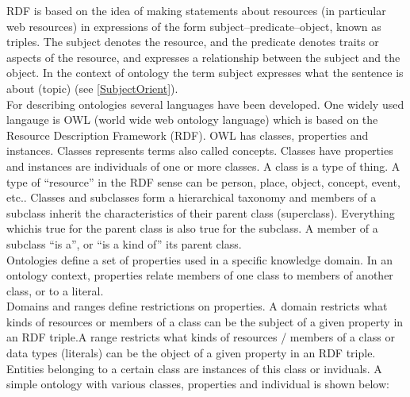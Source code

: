 RDF is based on the idea of making statements about resources (in particular web resources) in expressions of the form subject–predicate–object, known as triples. The subject denotes the resource, and the predicate denotes traits or aspects of the resource, and expresses a relationship between the subject and the object. In the context of ontology the term subject expresses what the sentence is about (topic) (see \ref{SubjectOrient}).\\
For describing ontologies several languages have been developed. One widely used langauge is OWL (world wide web ontology language) which is based on the Resource Description Framework (RDF).
OWL has classes, properties and instances. Classes represents terms also called concepts. Classes have properties and instances are individuals of one or more classes.
A class is a type of thing. A type of “resource” in the RDF sense can be
person, place, object, concept, event, etc.. Classes and subclasses form a hierarchical
taxonomy and members of a subclass inherit the characteristics of their parent class
(superclass). Everything whichis true for the parent class is also true for the subclass.
A member of a subclass “is a”, or “is a kind of” its parent class.\\
Ontologies define a set of properties used in a specific knowledge domain. In an ontology context, properties relate members of one class to members of another class, or to a literal.\\
Domains and ranges define restrictions on properties. A domain restricts what kinds of resources or members of a class can be the subject of a given property in an
RDF triple.A range restricts what kinds of resources / members of a
class or data types (literals) can be the object of a given property in an RDF triple.\\
Entities belonging to a certain class are instances of this class or inviduals. A simple ontology with various classes, properties and individual is shown below:


